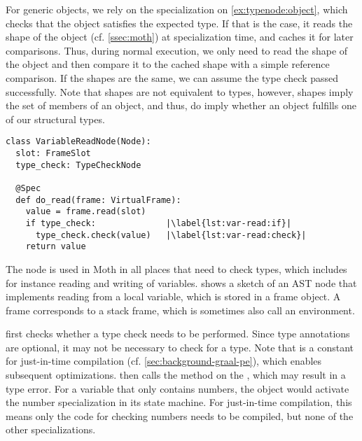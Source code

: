 For generic objects, we rely on the specialization on \cref{ex:typenode:object},
which checks that the object satisfies the expected type.
If that is the case, it reads the shape of the object (cf. \cref{ssec:moth}) at specialization time,
and caches it for later comparisons.
Thus, during normal execution,
we only need to read the shape of the object and then compare it to the cached shape
with a simple reference comparison.
If the shapes are the same, we can assume the type check passed successfully.
Note that shapes are not equivalent to types,
however, shapes imply the set of members of an object, and thus,
do imply whether an object fulfills one of our structural types.

\begin{lstlisting}[label={lst:variable-read},escapechar=|,%
  caption={Sketch of a \code{VariableReadNode} using the \code{TypeCheckNode} to ensure Grace's transient semantics.},%
  float,floatplacement=htb,%
  columns=flexible,morekeywords={global,raise,pass,unknown,not}]
class VariableReadNode(Node):
  slot: FrameSlot
  type_check: TypeCheckNode

  @Spec
  def do_read(frame: VirtualFrame):
    value = frame.read(slot)
    if type_check:              |\label{lst:var-read:if}|
      type_check.check(value)   |\label{lst:var-read:check}|
    return value
\end{lstlisting}

The  node is used in Moth in all places that need to check
types, which includes for instance reading and writing of variables.
 shows a sketch of an AST node that implements reading
from a local variable, which is stored in a frame object.
A frame corresponds to a stack frame, which is sometimes also call an environment.

 first checks whether a type check needs to be performed.
Since type annotations are optional, it may not be necessary to check for a type.
Note that  is a constant
for just-in-time compilation (cf. \cref{sec:background-graal-pe}),
which enables subsequent optimizations.
 then calls the  method on the
, which may result in a type error.
For a variable that only contains numbers, the  object
would activate the number specialization in its state machine.
For just-in-time compilation, this means only the code for
checking numbers needs to be compiled, but none of the other specializations.

